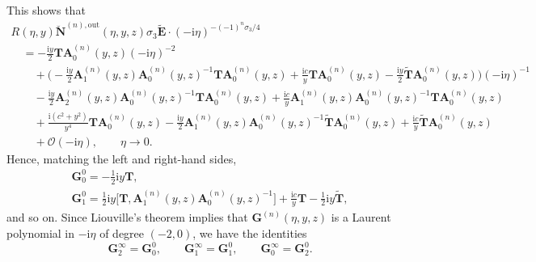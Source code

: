 \documentclass[pdftex]{sigma}
\numberwithin{equation}{section}
\begin{document}
\noindent
 This shows that
\begin{gather*}
R(\eta,y)\breve{\mathbf{N}}^{(n),\mathrm{out}}(\eta,y,z)\sigma_3\widetilde{\mathbf{E}}\cdot(-\mathrm{i}\eta)^{-(-1)^n\sigma_3/4}\\
\quad{} =-\frac{\mathrm{i} y}{2}\mathbf{T}\mathbf{A}_0^{(n)}(y,z) (-\mathrm{i}\eta)^{-2} \\
 \qquad{}+ \biggl(-\frac{\mathrm{i} y}{2} \mathbf{A}_1^{(n)}(y,z)\mathbf{A}_0^{(n)}(y,z)^{-1}\mathbf{T}\mathbf{A}_0^{(n)}(y,z)+\frac{\mathrm{i} c}{y}\mathbf{T}\mathbf{A}_0^{(n)}(y,z)-\frac{\mathrm{i} y}{2}\widetilde{\mathbf{T}}\mathbf{A}_0^{(n)}(y,z)\biggr)(-\mathrm{i}\eta)^{-1} \\
 \qquad{}-\frac{\mathrm{i} y}{2}\mathbf{A}_2^{(n)}(y,z)\mathbf{A}_0^{(n)}(y,z)^{-1}\mathbf{T}\mathbf{A}_0^{(n)}(y,z)+\frac{\mathrm{i} c}{y}\mathbf{A}_1^{(n)}(y,z)\mathbf{A}_0^{(n)}(y,z)^{-1}\mathbf{T}\mathbf{A}_0^{(n)}(y,z)\\
 \qquad{}+\frac{\mathrm{i} (c^2+y^2)}{y^4}\mathbf{T}\mathbf{A}_0^{(n)}(y,z) -\frac{\mathrm{i} y}{2}\mathbf{A}_1^{(n)}(y,z)\mathbf{A}_0^{(n)}(y,z)^{-1}\widetilde{\mathbf{T}}\mathbf{A}_0^{(n)}(y,z) +\frac{\mathrm{i} c}{y}\widetilde{\mathbf{T}}\mathbf{A}_0^{(n)}(y,z) \\
 \qquad{}+\mathcal{O}(-\mathrm{i}\eta),\qquad\eta\to 0.
\end{gather*}
Hence, matching the left and right-hand sides,
\begin{gather*}
\mathbf{G}_0^0=-\tfrac{1}{2}\mathrm{i} y\mathbf{T},
\\
\mathbf{G}_1^0=\tfrac{1}{2}\mathrm{i} y\big[\mathbf{T},\mathbf{A}_1^{(n)}(y,z)\mathbf{A}_0^{(n)}(y,z)^{-1}\big]+\frac{\mathrm{i} c}{y}\mathbf{T}-\tfrac{1}{2}\mathrm{i} y\widetilde{\mathbf{T}},
\end{gather*}
and so on. Since Liouville's theorem implies that $\mathbf{G}^{(n)}(\eta,y,z)$ is a Laurent polynomial in $-\mathrm{i}\eta$ of degree $(-2,0)$, we have the identities
\begin{equation*}
\mathbf{G}^\infty_2=\mathbf{G}_0^0,\qquad\mathbf{G}^\infty_1=\mathbf{G}_1^0,\qquad\mathbf{G}^\infty_0=\mathbf{G}_2^0.
\end{equation*}
\end{document}
